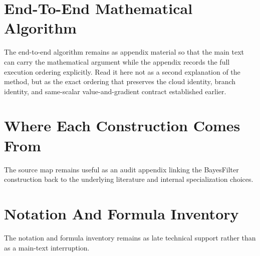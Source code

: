 \documentclass[11pt]{article}
\numberwithin{equation}{section}
\begin{document}
\section{End-To-End Mathematical Algorithm}
\label{sec:p32-end-to-end-algorithm}

The end-to-end algorithm remains as appendix material so that the main text can
carry the mathematical argument while the appendix records the full execution
ordering explicitly.  Read it here not as a second explanation of the method, but
as the exact ordering that preserves the cloud identity, branch identity, and
same-scalar value-and-gradient contract established earlier.

\section{Where Each Construction Comes From}
\label{sec:p32-source-map}

The source map remains useful as an audit appendix linking the BayesFilter
construction back to the underlying literature and internal specialization
choices.

\section{Notation And Formula Inventory}
\label{sec:p32-defaults}

The notation and formula inventory remains as late technical support rather than
as a main-text interruption.



\end{document}
